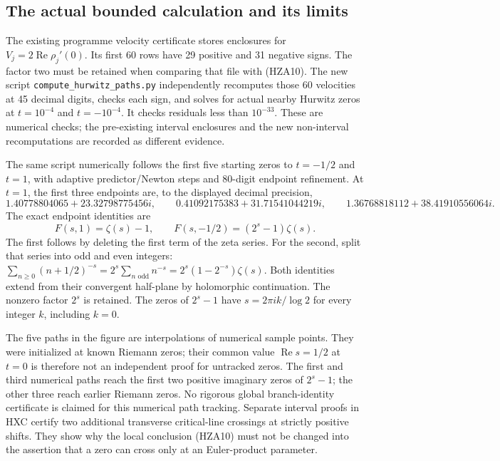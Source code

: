 \subsection{The actual bounded calculation and its limits}

The existing programme velocity certificate stores enclosures for
$V_j=2\operatorname{Re}\rho_j'(0)$. Its first 60 rows have 29
positive and 31 negative signs. The factor two must be retained when
comparing that file with (HZA10). The new script
\texttt{compute\_hurwitz\_paths.py} independently recomputes those
60 velocities at 45 decimal digits, checks each sign, and solves
for actual nearby Hurwitz zeros at $t=10^{-4}$ and $t=-10^{-4}$.
It checks residuals less than $10^{-33}$. These are numerical checks;
the pre-existing interval enclosures and the new non-interval
recomputations are recorded as different evidence.

The same script numerically follows the first five starting zeros
to $t=-1/2$ and $t=1$, with adaptive predictor/Newton steps and
80-digit endpoint refinement. At $t=1$, the first three endpoints
are, to the displayed decimal precision,
\[
 1.40778804065+23.32798775456i,\qquad
 0.41092175383+31.71541044219i,\qquad
 1.36768818112+38.41910556064i.
\]
The exact endpoint identities are
\begin{equation}\tag{HZA13}
 F(s,1)=\zeta(s)-1,\qquad
 F(s,-1/2)=(2^s-1)\zeta(s).
\end{equation}
The first follows by deleting the first term of the zeta series.
For the second, split that series into odd and even integers:
$\sum_{n\ge0}(n+1/2)^{-s}=2^s\sum_{n\text{ odd}}n^{-s}
=2^s(1-2^{-s})\zeta(s)$. Both identities extend from their
convergent half-plane by holomorphic continuation. The nonzero
factor $2^s$ is retained. The zeros of $2^s-1$ have
$s=2\pi i k/\log2$ for every integer $k$, including $k=0$.

The five paths in the figure are interpolations of numerical sample
points. They were initialized at known Riemann zeros; their common
value $\operatorname{Re}s=1/2$ at $t=0$ is therefore not an
independent proof for untracked zeros. The first and third numerical
paths reach the first two positive imaginary zeros of $2^s-1$;
the other three reach earlier Riemann zeros. No rigorous global
branch-identity certificate is claimed for this numerical path
tracking. Separate interval proofs in HXC certify two additional
transverse critical-line crossings at strictly positive shifts.
They show why the local conclusion (HZA10) must not be changed into
the assertion that a zero can cross only at an Euler-product parameter.
